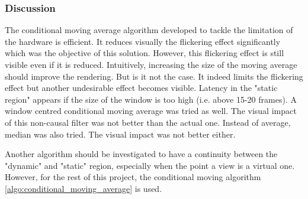\subsubsection{Discussion}

The conditional moving average algorithm developed to tackle the limitation of the hardware is efficient. It reduces visually the flickering effect significantly which was the objective of this solution. However, this flickering effect is still visible even if it is reduced. Intuitively, increasing the size of the moving average should improve the rendering. But is it not the case. It indeed limits the flickering effect but another undesirable effect becomes visible. Latency in the "static region" appears if the size of the window is too high (i.e. above 15-20 frames). A window centred conditional moving average was tried as well. The visual impact of this non-causal filter was not better than the actual one. Instead of average, median was also tried. The visual impact was not better either.

Another algorithm should be investigated to have a continuity between the "dynamic" and "static" region, especially when the point a view is a virtual one. However, for the rest of this project, the conditional moving algorithm \ref{algo:conditional_moving_average} is used.
